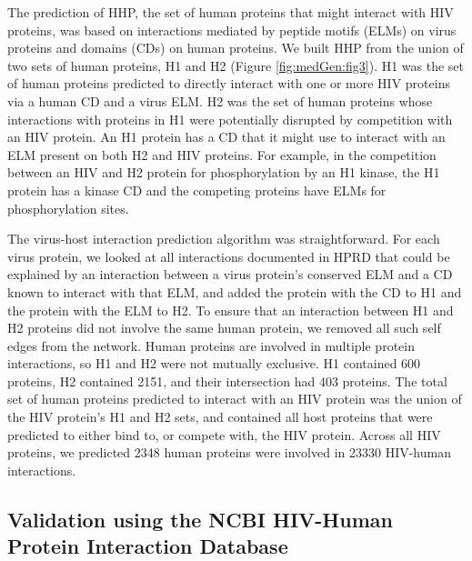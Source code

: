The prediction of HHP, the set of human proteins that might interact
with HIV proteins, was based on interactions mediated by peptide
motifs (ELMs) on virus proteins and domains (CDs) on human
proteins. We built HHP from the union of two sets of human proteins,
H1 and H2 (Figure \ref{fig:medGen:fig3}). H1 was the set of human
proteins predicted to directly interact with one or more HIV proteins
via a human CD and a virus ELM. H2 was the set of human proteins whose
interactions with proteins in H1 were potentially disrupted by
competition with an HIV protein. An H1 protein has a CD that it might
use to interact with an ELM present on both H2 and HIV proteins. For
example, in the competition between an HIV and H2 protein for
phosphorylation by an H1 kinase, the H1 protein has a kinase CD and
the competing proteins have ELMs for phosphorylation sites.

The virus-host interaction prediction algorithm was
straightforward. For each virus protein, we looked at all interactions
documented in HPRD that could be explained by an interaction between a
virus protein's conserved ELM and a CD known to interact with that
ELM, and added the protein with the CD to H1 and the protein with the
ELM to H2. To ensure that an interaction between H1 and H2 proteins
did not involve the same human protein, we removed all such self edges
from the network. Human proteins are involved in multiple protein
interactions, so H1 and H2 were not mutually exclusive. H1 contained
600 proteins, H2 contained 2151, and their intersection had 403
proteins. The total set of human proteins predicted to interact with
an HIV protein was the union of the HIV protein's H1 and H2 sets, and
contained all host proteins that were predicted to either bind to, or
compete with, the HIV protein. Across all HIV proteins, we predicted
2348 human proteins were involved in 23330 HIV-human interactions.

\subsection{Validation using the NCBI HIV-Human Protein Interaction Database}

